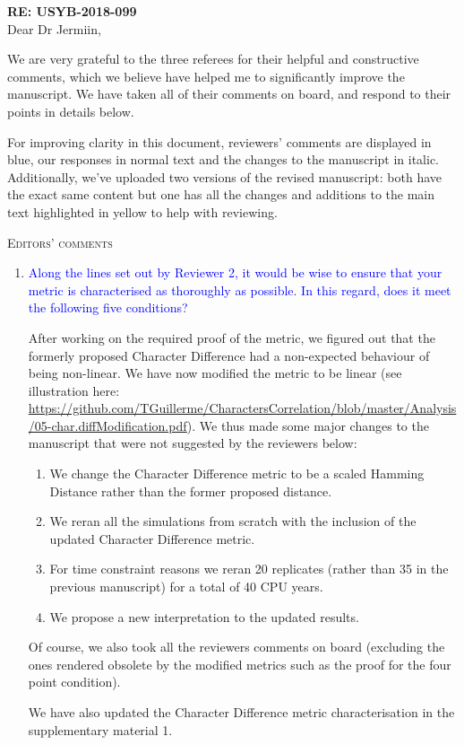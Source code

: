 \documentclass[12pt,letterpaper]{article}
\renewcommand{\section}[1]{%
\bigskip
\begin{center}
\begin{Large}
\normalfont\scshape #1
\medskip
\end{Large}
\end{center}}
\begin{document}
\textbf{RE: USYB-2018-099}\\
\bigskip
Dear Dr Jermiin,\\
\bigskip

We are very grateful to the three referees for their helpful and constructive comments, which we believe have helped me to significantly improve the manuscript.
We have taken all of their comments on board, and respond to their points in details below.

For improving clarity in this document, reviewers' comments are displayed in blue, our responses in normal text and the changes to the manuscript in italic.
Additionally, we've uploaded two versions of the revised manuscript: both have the exact same content but one has all the changes and additions to the main text highlighted in yellow to help with reviewing.

\section{Editors' comments}

\begin{enumerate}
\label{metric_change}

\item{\textcolor{blue}{Along the lines set out by Reviewer 2, it would be wise to ensure that your metric is characterised as thoroughly as possible. In this regard, does it meet the following five conditions?}}

After working on the required proof of the metric, we figured out that the formerly proposed Character Difference had a non-expected behaviour of being non-linear.
We have now modified the metric to be linear (see illustration here: \url{https://github.com/TGuillerme/CharactersCorrelation/blob/master/Analysis/05-char.diffModification.pdf}).
We thus made some major changes to the manuscript that were not suggested by the reviewers below:
\begin{enumerate}
    \item We change the Character Difference metric to be a scaled Hamming Distance rather than the former proposed distance.
    \item We reran all the simulations from scratch with the inclusion of the updated Character Difference metric.
    \item For time constraint reasons we reran 20 replicates (rather than 35 in the previous manuscript) for a total of 40 CPU years.
    \item We propose a new interpretation to the updated results.
\end{enumerate}

Of course, we also took all the reviewers comments on board (excluding the ones rendered obsolete by the modified metrics such as the proof for the four point condition).

We have also updated the Character Difference metric characterisation in the supplementary material 1.

\end{enumerate}
\end{document}
